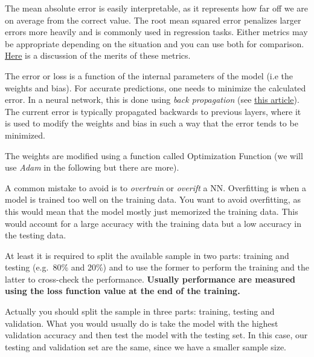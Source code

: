 The mean absolute error is easily interpretable, as it represents how
far off we are on average from the correct value. The root mean squared
error penalizes larger errors more heavily and is commonly used in
regression tasks. Either metrics may be appropriate depending on the
situation and you can use both for comparison.
\href{https://medium.com/human-in-a-machine-world/mae-and-rmse-which-metric-is-better-e60ac3bde13d}{Here}
is a discussion of the merits of these metrics.

The error or loss is a function of the internal parameters of the model
(i.e the weights and bias). For accurate predictions, one needs to
minimize the calculated error. In a neural network, this is done using
\emph{back propagation} (see
\href{https://towardsdatascience.com/understanding-backpropagation-algorithm-7bb3aa2f95fd}{this article}).
The current error is typically propagated backwards to previous layers,
where it is used to modify the weights and bias in such
a way that the error tends to be minimized.

The weights are modified using a function called Optimization Function
(we will use \emph{Adam} in the following but there are
more).


A common mistake to avoid is to \emph{overtrain} or \emph{overift} a NN. %
Overfitting is when a model is trained too well on the training data. You want to avoid overfitting, as this would mean that the model mostly just memorized the training data. This would account for a large accuracy with the training data but a low accuracy in the testing data. 

At least it is required to split the available sample in two parts:
training and testing (e.g.~80\% and 20\%) and to use the former to
perform the training and the latter to cross-check the performance.
\textbf{Usually performance are measured using the loss function value
at the end of the training.}

Actually you should split the sample in three parts: training, testing and validation. What you would usually do is take the model with the highest validation accuracy and then test the model with the testing set.
In this case, our testing and validation set are the same, since we have a smaller sample size.

